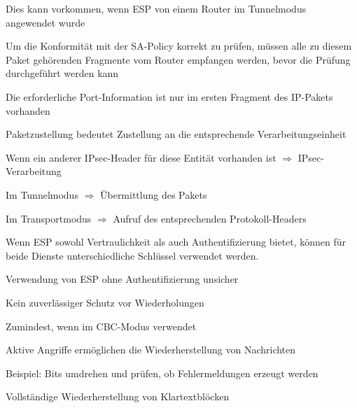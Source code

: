 \documentclass[a4paper]{article}
\begin{document}
\begin{multicols}{3}
\begin{itemize*}
\begin{itemize*}
                  \item Dies kann vorkommen, wenn ESP von einem Router im Tunnelmodus angewendet wurde
                  \item Um die Konformität mit der SA-Policy korrekt zu prüfen, müssen alle zu diesem Paket gehörenden Fragmente vom Router empfangen werden, bevor die Prüfung durchgeführt werden kann
                  \item Die erforderliche Port-Information ist nur im ersten Fragment des IP-Pakets vorhanden
            \end{itemize*}
            \item Paketzustellung bedeutet Zustellung an die entsprechende Verarbeitungseinheit
            \begin{itemize*}
                  \item Wenn ein anderer IPsec-Header für diese Entität vorhanden ist $\Rightarrow$ IPsec-Verarbeitung
                  \item Im Tunnelmodus $\Rightarrow$ Übermittlung des Pakets
                  \item Im Transportmodus $\Rightarrow$ Aufruf des entsprechenden Protokoll-Headers %
            \end{itemize*}
            \item Wenn ESP sowohl Vertraulichkeit als auch Authentifizierung bietet, können für beide Dienste unterschiedliche Schlüssel verwendet werden. %
            \item Verwendung von ESP ohne Authentifizierung unsicher
            \begin{itemize*}
                  \item Kein zuverlässiger Schutz vor Wiederholungen
                  \item Zumindest, wenn im CBC-Modus verwendet
                  \item Aktive Angriffe ermöglichen die Wiederherstellung von Nachrichten
                  \item Beispiel: Bits umdrehen und prüfen, ob Fehlermeldungen erzeugt werden
                  \item Vollständige Wiederherstellung von Klartextblöcken
            \end{itemize*}
      \end{itemize*}


\end{multicols}
\end{document}
